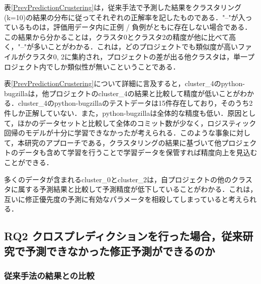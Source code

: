 \documentclass[T,J]{fose} %
\begin{document}
表\ref{PrevPredictionCrustering}は，従来手法で予測した結果をクラスタリング(k=10)の結果の分布に従ってそれぞれの正解率を記したものである．"--"が入っているものは，評価用データ内に正例 / 負例がともに存在しない場合である．この結果から分かることは，クラスタ0とクラスタ2の精度が他に比べて高く，"--"が多いことがわかる．これは，どのプロジェクトでも類似度が高いファイルがクラスタ0, 2に集約され，プロジェクトの差が出る他クラスタは，単一プロジェクト内でしか類似性が無いこということである．

表\ref{PrevPredictionCrustering}について詳細に言及すると，cluster\_4のpython-bugzillaは，他プロジェクトのcluster\_4の結果と比較して精度が低いことがわかる．cluster\_4のpython-bugzillaのテストデータは15件存在しており，そのうち2件しか正解していない．また，python-bugzillaは全体的な精度も低い．原因として，ほかのデータセットと比較して全体のコミット数が少なく，ロジスティック回帰のモデルが十分に学習できなかったが考えられる．このような事象に対して，本研究のアプローチである，クラスタリングの結果に基づいて他プロジェクトのデータも含めて学習を行うことで学習データを保管すれば精度向上を見込むことができる．

多くのデータが含まれるcluster\_0とcluster\_2は，自プロジェクトの他のクラスタに属する予測結果と比較して予測精度が低下していることがわかる．これは，互いに修正優先度の予測に有効なパラメータを相殺してしまっていると考えられる．

\subsection{RQ2 クロスプレディクションを行った場合，従来研究で予測できなかった修正予測ができるのか}
\subsubsection{従来手法の結果との比較}
\end{document}
